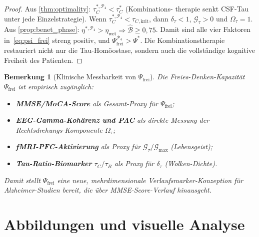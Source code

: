 ﻿\documentclass[12pt,a4paper]{article}
\newtheorem{remark}[theorem]{Bemerkung}
\theoremstyle{definition}
\begin{document}
	\begin{proof}
		Aus \cref{thm:optimality}: $\tau_C^{*,\mathcal{P}_4} < \tau_C^*$ (Kombinations-
		therapie senkt CSF-Tau unter jede Einzelstrategie). Wenn $\tau_C^{*,\mathcal{P}_4} <
		\tau_{C,\mathrm{krit}}$, dann $\delta_\tau < 1$, $\mathcal{G}_\tau > 0$ und
		$\Omega_\tau = 1$. Aus \cref{prop:benet_phase}: $\eta^{*,\mathcal{P}_4} > \eta_{\mathrm{wet}}
		\Rightarrow \hat{\mathcal{B}} \geq 0{,}75$.
		Damit sind alle vier Faktoren in~\eqref{eq:psi_frei} streng positiv,
		und $\Psi_{\mathrm{frei}}^{\mathcal{P}_4} > \Psi^*$. Die Kombinations\-therapie
		restauriert nicht nur die Tau-Homöostase, sondern auch die vollständige kognitive
		Freiheit des Patienten.
	\end{proof}

	\begin{remark}[Klinische Messbarkeit von $\Psi_{\mathrm{frei}}$]
		Die Freies-Denken-Kapazität $\Psi_{\mathrm{frei}}$ ist empirisch zugänglich:
		\begin{itemize}
			\item \textbf{MMSE/MoCA-Score} als Gesamt-Proxy für $\Psi_{\mathrm{frei}}$;
			\item \textbf{EEG-Gamma-Kohärenz und PAC} als direkte Messung der
			      Rechtsdrehungs-Komponente $\Omega_\tau$;
			\item \textbf{fMRI-PFC-Aktivierung} als Proxy für
			      $\mathcal{G}_\tau/\mathcal{G}_{\max}$ (Lebensgeist);
			\item \textbf{Tau-Ratio-Biomarker} $\tau_C/\tau_B$ als Proxy für
			      $\delta_\tau$ (Wolken-Dichte).
		\end{itemize}
		Damit stellt $\Psi_{\mathrm{frei}}$ eine neue, mehrdimensionale Verlaufsmarker-Konzeption
		für Alzheimer-Studien bereit, die über MMSE-Score-Verlauf hinausgeht.
	\end{remark}

	\section{Abbildungen und visuelle Analyse}
	
\end{document}
